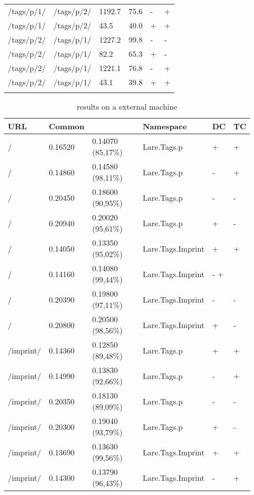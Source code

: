 \begin{appendix}
\begin{center}
\begin{longtable}{llllll}
/tags/p/1/ & /tags/p/2/ & 1192.7 & 75.6 & - & + \\
/tags/p/1/ & /tags/p/2/ & 43.5 & 40.0 & + & + \\
\hline
/tags/p/2/ & /tags/p/1/ & 1227.2 & 99.8 & - & - \\
/tags/p/2/ & /tags/p/1/ & 82.2 & 65.3 & + & - \\
/tags/p/2/ & /tags/p/1/ & 1221.1 & 76.8 & - & + \\
/tags/p/2/ & /tags/p/1/ & 43.1 & 39.8 & + & + \\
\hline
\label{tab:curl_results_local}
\end{longtable}
\end{center}

\newpage{}

\begin{center}
\small
\begin{longtable}{llllll}
    \caption{\curl{} results on a external machine}
    \\
	\hline
	\textbf{URL} & \textbf{Common} & \textbf{\lare{}} & \textbf{Namespace} & \textbf{DC} & \textbf{TC}\\
	\hline
	/ & 0.16520 & 0.14070 (85,17\%) & Lare.Tags.p & + & + \\
	/ & 0.14860 & 0.14580 (98,11\%) & Lare.Tags.p & - & + \\
	/ & 0.20450 & 0.18600 (90,95\%) & Lare.Tags.p & - & - \\
	/ & 0.20940 & 0.20020 (95,61\%) & Lare.Tags.p & + & - \\
	\hline
	/ & 0.14050 & 0.13350 (95,02\%) & Lare.Tags.Imprint & + & + \\
	/ & 0.14160 & 0.14080 (99,44\%) & Lare.Tags.Imprint & - + & \\
	/ & 0.20390 & 0.19800 (97,11\%) & Lare.Tags.Imprint & - & - \\
	/ & 0.20800 & 0.20500 (98,56\%) & Lare.Tags.Imprint & + & - \\
	\hline
	\hline
	/imprint/ & 0.14360 & 0.12850 (89,48\%) & Lare.Tags.p & + & + \\
	/imprint/ & 0.14990 & 0.13830 (92,66\%) & Lare.Tags.p & - & + \\
	/imprint/ & 0.20350 & 0.18130 (89,09\%) & Lare.Tags.p & - & - \\
	/imprint/ & 0.20300 & 0.19040 (93,79\%) & Lare.Tags.p & + & - \\
	\hline
	/imprint/ & 0.13690 & 0.13630 (99,56\%) & Lare.Tags.Imprint & + & + \\
	/imprint/ & 0.14300 & 0.13790 (96,43\%) & Lare.Tags.Imprint & - & + \\

\end{longtable}
\end{center}
\end{appendix}
